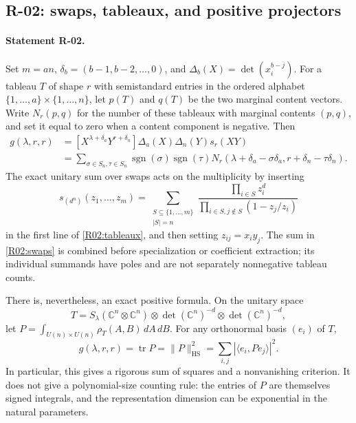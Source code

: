 \subsection{R-02: swaps, tableaux, and positive projectors}

\paragraph{Statement R-02.}
Set $m=an$, $\delta_b=(b-1,b-2,\ldots,0)$, and
$\Delta_b(X)=\det(x_i^{b-j})$. For a tableau $T$ of shape $r$ with
semistandard entries in the ordered alphabet $\{1,\ldots,a\}\times
\{1,\ldots,n\}$, let $p(T)$ and $q(T)$ be the two marginal content vectors.
Write $N_r(p,q)$ for the number of these tableaux with marginal contents
$(p,q)$, and set it equal to zero when a content component is negative.
Then
\begin{align}\label{R02:tableaux}
 g(\lambda,r,r)
 &= [X^{\lambda+\delta_a}Y^{r+\delta_n}]
       \Delta_a(X)\Delta_n(Y)s_r(XY)\\
 &=\sum_{\sigma\in S_a,\tau\in S_n}
    \operatorname{sgn}(\sigma)\operatorname{sgn}(\tau)
    N_r(\lambda+\delta_a-\sigma\delta_a,
        r+\delta_n-\tau\delta_n).\nonumber
\end{align}
The exact unitary sum over swaps acts on the multiplicity by inserting
\begin{equation}\label{R02:swaps}
 s_{(d^n)}(z_1,\ldots,z_m)=
 \sum_{\substack{S\subseteq\{1,\ldots,m\}\\|S|=n}}
 \frac{\prod_{i\in S}z_i^d}
      {\prod_{i\in S,j\notin S}(1-z_j/z_i)}
\end{equation}
in the first line of \eqref{R02:tableaux}, and then setting $z_{ij}=x_i y_j$.
The sum in \eqref{R02:swaps} is combined before specialization or coefficient
extraction; its individual summands have poles and are not separately
nonnegative tableau counts.

There is, nevertheless, an exact positive formula. On the unitary space
\[
 T=S_\lambda(\mathbb C^n\otimes\mathbb C^n)
       \otimes\det(\mathbb C^n)^{-d}\otimes\det(\mathbb C^n)^{-d},
\]
let $P=\int_{U(n)\times U(n)}\rho_T(A,B)\,dA\,dB$. For any orthonormal
basis $(e_i)$ of $T$,
\begin{equation}\label{R02:projector}
 g(\lambda,r,r)=\operatorname{tr}P
   =\|P\|_{\mathrm{HS}}^2=\sum_{i,j}|\langle e_i,Pe_j\rangle|^2.
\end{equation}
In particular, this gives a rigorous sum of squares and a nonvanishing
criterion. It does not give a polynomial-size counting rule: the entries
of $P$ are themselves signed integrals, and the representation dimension
can be exponential in the natural parameters.

